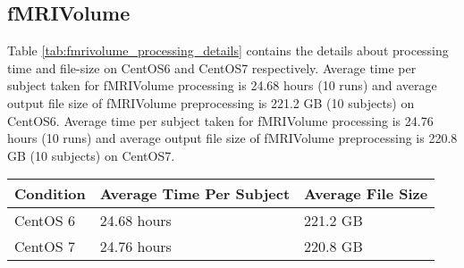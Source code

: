 
\subsection{fMRIVolume}
Table \ref{tab:fmrivolume_processing_details} contains the details about processing time and file-size on CentOS6 and CentOS7 respectively.
Average time per subject taken for fMRIVolume processing is 24.68 hours (10 runs) and average output file size of fMRIVolume preprocessing is 221.2 GB (10 subjects) on CentOS6.
Average time per subject taken for fMRIVolume processing is 24.76 hours (10 runs) and average output file size of fMRIVolume preprocessing is 220.8 GB (10 subjects) on CentOS7.

\begin{center}
\begin{tabular}{ | l | l | l | }
  \hline
    \textbf{Condition} & \textbf{Average Time Per Subject} & \textbf{Average File Size} \\
  \hline
    CentOS 6 & 24.68 hours & 221.2 GB \\
  \hline
    CentOS 7 & 24.76 hours & 220.8 GB \\
  \hline
\end{tabular}
\label{tab:fmrivolume_processing_details}
\end{center}



